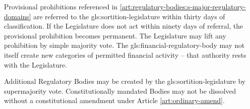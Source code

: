 Provisional prohibitions referenced in \ref{art:regulatory-bodies:s-major-regulatory-domains} are referred to the \gls{gls:sortition-legislature} within thirty days of classification. If the Legislature does not act within ninety days of referral, the provisional prohibition becomes permanent. The Legislature may lift any prohibition by simple majority vote. The \gls{gls:financial-regulatory-body} may not itself create new categories of permitted financial activity -- that authority rests with the Legislature.

Additional Regulatory Bodies may be created by the \gls{gls:sortition-legislature} by supermajority vote. Constitutionally mandated Bodies may not be dissolved without a constitutional amendment under Article \ref{art:ordinary-amend}.